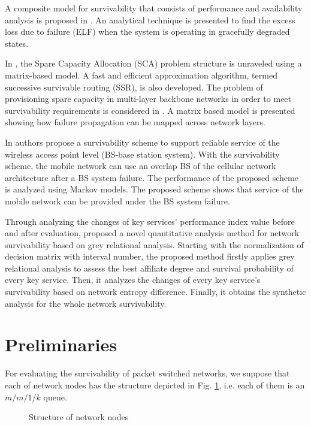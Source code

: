 \documentclass[onecolumn,conference]{IEEEtran}
\begin{document}
    A composite model for survivability that consists of performance and availability analysis is proposed in \cite{b3}. An analytical technique is presented to find the excess loss due to failure (ELF) when the system is operating in gracefully degraded states.

    In \cite{b8}, the Spare Capacity Allocation (SCA) problem structure is unraveled using a matrix-based model. A fast and efficient approximation algorithm, termed successive survivable routing (SSR), is also developed. The problem of provisioning spare capacity in multi-layer backbone networks in order to meet survivability requirements is considered in \cite{b9}. A matrix based model is presented showing how failure propagation can be mapped across network layers.

    In \cite{b10} authors propose a survivability scheme to support reliable service of the wireless access point level (BS-base station system). With the survivability scheme, the mobile network can use an overlap BS of the cellular network architecture after a BS system failure. The performance of the proposed scheme is analyzed using Markov models. The proposed scheme shows that service of the mobile network can be provided under the BS system failure.

    Through analyzing the changes of key services' performance index value before and after evaluation, \cite{b15} proposed a novel quantitative analysis method for network survivability based on grey relational analysis. Starting with the normalization of decision matrix with interval number, the proposed method firstly applies grey relational analysis to assess the best affiliate degree and survival probability of every key service. Then, it analyzes the changes of every key service's survivability based on network entropy difference. Finally, it obtains the synthetic analysis for the whole network survivability.

    \section{Preliminaries} \label{sec:prel}
    For evaluating the survivability of packet switched networks, we suppose that each of network nodes has the structure depicted in Fig. \ref{fig:1}, i.e. each of them is an $m/m/1/k$ queue.

    \begin{figure}[htbp]
        \centering
        \caption{Structure of network nodes}
        \label{fig:1}
    \end{figure}
\end{document}
